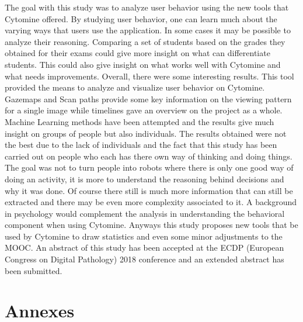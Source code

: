 \documentclass[a4paper,11pt]{report}
\numberwithin{figure}{section} %
\begin{document}
    The goal with this study was to analyze user behavior using the new tools that Cytomine offered.
    By studying user behavior, one can learn much about the varying ways that users use the application.
    In some cases it may be possible to analyze their reasoning.
    Comparing a set of students based on the grades they obtained for their exams could give more insight on what can differentiate students.
    This could also give insight on what works well with Cytomine and what needs improvements.
    Overall, there were some interesting results.
    This tool provided the means to analyze and visualize user behavior on Cytomine.
    Gazemaps and Scan paths provide some key information on the viewing pattern for a single image while timelines gave an overview on the project as a whole.
    Machine Learning methods have been attempted and the results give much insight on groups of people but also individuals.
    The results obtained were not the best due to the lack of individuals and the fact that this study has been carried out on people who each has there own way of thinking and doing things.
    The goal was not to turn people into robots where there is only one good way of doing an activity, it is more to understand the reasoning behind decisions and why it was done.
    Of course there still is much more information that can still be extracted and there may be even more complexity associated to it.
    A background in psychology would complement the analysis in understanding the behavioral component when using Cytomine.
    Anyways this study proposes new tools that be used by Cytomine to draw statistics and even some minor adjustments to the MOOC.
    An abstract of this study has been accepted at the  ECDP (European Congress on Digital Pathology) 2018 conference and an extended abstract has been submitted.


{}



\chapter*{Annexes}

\begin{table}[h!]
    \caption{Source Code References}
\end{table}
\end{document}
